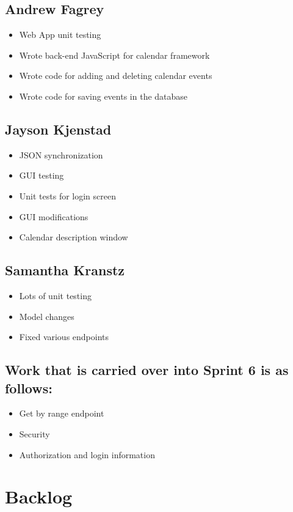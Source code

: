 \documentclass{article}
\begin{document}
{\subsection*{Andrew Fagrey}
\begin{itemize}
\item Web App unit testing
\item Wrote back-end JavaScript for calendar framework
\item Wrote code for adding and deleting calendar events
\item Wrote code for saving events in the database
\end{itemize}

\subsection*{Jayson Kjenstad}
\begin{itemize}
\item JSON synchronization
\item GUI testing
\item Unit tests for login screen
\item GUI modifications
\item Calendar description window
\end{itemize}

\subsection*{Samantha Kranstz}
\begin{itemize}
\item Lots of unit testing
\item Model changes
\item Fixed various endpoints
\end{itemize}

\subsection*{Work that is carried over into Sprint 6 is as follows:}
\begin{itemize}
\item Get by range endpoint
\item Security
\item Authorization and login information
\end{itemize}

\section*{Backlog}
}
\end{document}
